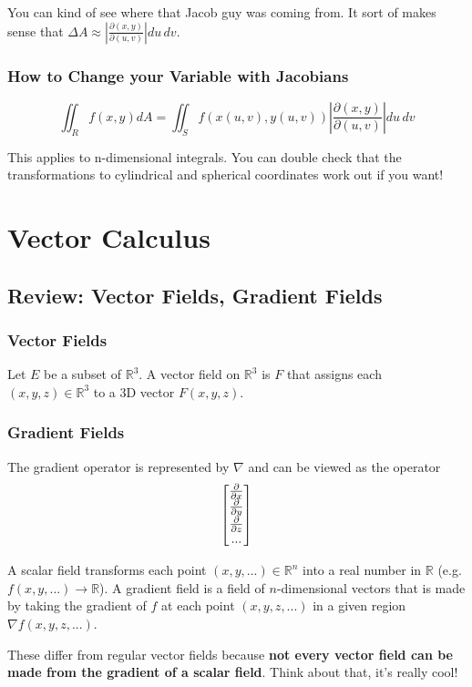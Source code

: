\documentclass[a4paper,12pt]{report}
\begin{document}
You can kind of see where that Jacob guy was coming from. It sort of makes sense that 
$\Delta A \approx |\frac{\partial (x, y)}{\partial (u, v)}| du\, dv$. 

\subsection{How to Change your Variable with Jacobians}
$$\iint_R f(x, y) dA = \iint_S f(x(u, v), y(u, v))|\frac{\partial (x, y)}{\partial (u, v)}|du\,dv$$

This applies to n-dimensional integrals. You can double check that the transformations to cylindrical and spherical coordinates 
work out if you want!

\chapter{Vector Calculus}
\section{Review: Vector Fields, Gradient Fields}
\subsection{Vector Fields}
Let $E$ be a subset of $\mathbb{R}^3$. A vector field on $\mathbb{R}^3$ is $F$ that assigns each 
$(x, y, z) \in \mathbb{R}^3$ to a 3D vector $F(x, y, z)$.

\subsection{Gradient Fields}
The gradient operator is represented by $\nabla$ and can be viewed as the operator 
$$
\begin{bmatrix}
\frac{\partial }{\partial x} \\ 
\frac{\partial }{\partial y} \\
\frac{\partial }{\partial z} \\
... \notag
\end{bmatrix}
$$

A scalar field transforms each point $(x, y, ...) \in \mathbb{R}^n$ into a real number in $\mathbb{R}$ (e.g. $f(x, y, ...) \to \mathbb{R}$).
A gradient field is a field of $n$-dimensional vectors that is made by taking the gradient of $f$ at each point $(x, y, z, ...)$ in 
a given region $\nabla f(x, y, z, ...)$.

These differ from regular vector fields because \textbf{not every vector field can be made from the gradient of a scalar field}.
Think about that, it's really cool!
\end{document}
